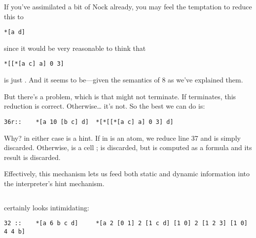 If you've assimilated a bit of Nock already, you may feel the
temptation to reduce this to

\begin{framed_shaded}
\begin{Verbatim}[fontsize=\relsize{-2.5},fontseries=b,commandchars=\\\{\}]
*[a d]
\end{Verbatim}
\end{framed_shaded}

since it would be very reasonable to think that

\begin{framed_shaded}
\begin{Verbatim}[fontsize=\relsize{-2.5},fontseries=b,commandchars=\\\{\}]
*[[*[a c] a] 0 3]
\end{Verbatim}
\end{framed_shaded}

is just .  And it seems to be---given the semantics of 8 as
we've explained them.

But there's a problem, which is that  might not terminate.
If  terminates, this reduction is correct.  Otherwise\ldots{}
it's not.  So the best we can do is:

\begin{framed_shaded}
\begin{Verbatim}[fontsize=\relsize{-2.5},fontseries=b,commandchars=\\\{\}]
36r::    *[a 10 [b c] d]  *[*[[*[a c] a] 0 3] d]
\end{Verbatim}
\end{framed_shaded}

Why?   in either case is a hint.  If  in \kode{[10 x y]} is an
atom, we reduce line 37 and  is simply discarded.  Otherwise,
 is a cell \kode{[b c]};  is discarded, but  is computed as a
formula and its result is discarded.

Effectively, this mechanism lets us feed both static and dynamic
information into the interpreter's hint mechanism.

\subsection{}

 certainly looks intimidating:

\begin{framed_shaded}
\begin{Verbatim}[fontsize=\relsize{-2.5},fontseries=b,commandchars=\\\{\}]
32 ::    *[a 6 b c d]     *[a 2 [0 1] 2 [1 c d] [1 0] 2 [1 2 3] [1 0] 4 4 b]
\end{Verbatim}
\end{framed_shaded}

